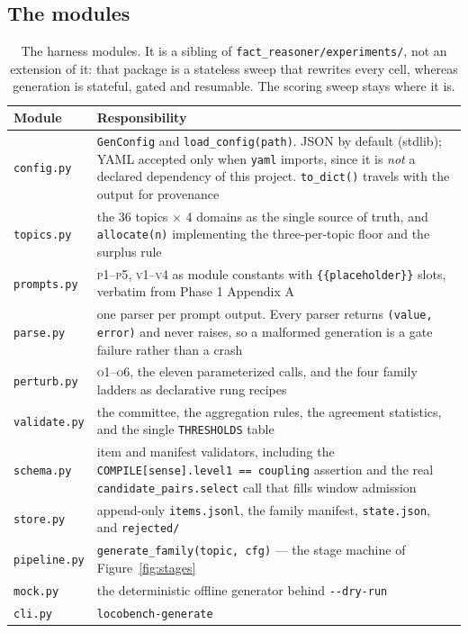 \documentclass[11pt]{article}
\newcommand{\pymod}[1]{\texttt{#1}}
\begin{document}
\subsection{The modules}

\begin{table}[h]\centering\small
\renewcommand{\arraystretch}{1.15}
\begin{tabular}{@{}lp{10.4cm}@{}}
\toprule
\textbf{Module} & \textbf{Responsibility}\\
\midrule
\pymod{config.py}   & \texttt{GenConfig} and \texttt{load\_config(path)}. JSON by default (stdlib);
  YAML accepted only when \texttt{yaml} imports, since it is \emph{not} a declared dependency of
  this project. \texttt{to\_dict()} travels with the output for provenance\\
\pymod{topics.py}   & the 36 topics $\times$ 4 domains as the single source of truth, and
  \texttt{allocate(n)} implementing the three-per-topic floor and the surplus rule\\
\pymod{prompts.py}  & \textsc{p1}--\textsc{p5}, \textsc{v1}--\textsc{v4} as module constants with
  \texttt{\{\{placeholder\}\}} slots, verbatim from Phase 1 Appendix A\\
\pymod{parse.py}    & one parser per prompt output. Every parser returns
  \texttt{(value, error)} and never raises, so a malformed generation is a gate failure rather
  than a crash\\
\pymod{perturb.py}  & \textsc{o1}--\textsc{o6}, the eleven parameterized calls, and the four family
  ladders as declarative rung recipes\\
\pymod{validate.py} & the committee, the aggregation rules, the agreement statistics, and the single
  \texttt{THRESHOLDS} table\\
\pymod{schema.py}   & item and manifest validators, including the
  \texttt{COMPILE[sense].level1 == coupling} assertion and the real
  \texttt{candidate\_pairs.select} call that fills window admission\\
\pymod{store.py}    & append-only \texttt{items.jsonl}, the family manifest, \texttt{state.json},
  and \texttt{rejected/}\\
\pymod{pipeline.py} & \texttt{generate\_family(topic, cfg)} --- the stage machine of
  Figure~\ref{fig:stages}\\
\pymod{mock.py}     & the deterministic offline generator behind \texttt{-{}-dry-run}\\
\pymod{cli.py}      & \texttt{locobench-generate}\\
\bottomrule
\end{tabular}
\caption{The harness modules. It is a sibling of \pymod{fact\_reasoner/experiments/}, not an
extension of it: that package is a stateless sweep that rewrites every cell, whereas generation is
stateful, gated and resumable. The scoring sweep stays where it is.}
\label{tab:modules}
\end{table}
\end{document}
